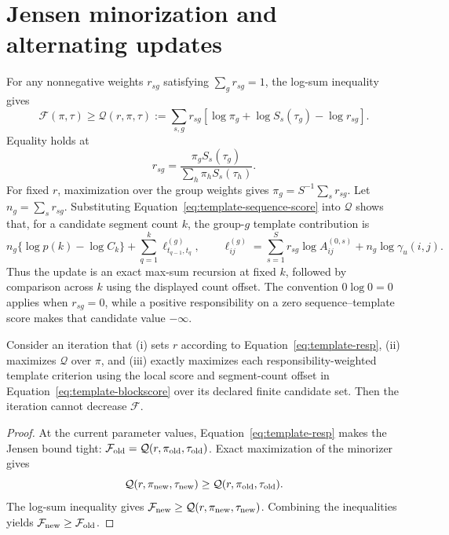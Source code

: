 \section{Jensen minorization and alternating updates}
\label{sec:latent-em}
For any nonnegative weights $r_{sg}$ satisfying $\sum_g r_{sg}=1$, the log-sum inequality gives
\begin{equation}
\mathcal F(\pi,\tau)\ge
\mathcal Q(r,\pi,\tau):=
\sum_{s,g}r_{sg}\left[\log\pi_g+\log S_s(\tau_g)-\log r_{sg}\right].
\label{eq:template-bound}
\end{equation}
Equality holds at
\begin{equation}
 r_{sg}=\frac{\pi_gS_s(\tau_g)}{\sum_h\pi_hS_s(\tau_h)}.
\label{eq:template-resp}
\end{equation}
For fixed $r$, maximization over the group weights gives
$\pi_g=S^{-1}\sum_s r_{sg}$. Let $n_g=\sum_s r_{sg}$. Substituting
Equation~\eqref{eq:template-sequence-score} into $\mathcal Q$ shows that, for a candidate segment
count $k$, the group-$g$ template contribution is
\begin{equation}
 n_g\{\log p(k)-\log C_k\}
 +\sum_{q=1}^{k}\ell^{(g)}_{t_{q-1},t_q},
\qquad
 \ell^{(g)}_{ij}=\sum_{s=1}^{S}r_{sg}\log A^{(0,s)}_{ij}
                  +n_g\log\gamma_u(i,j).
\label{eq:template-blockscore}
\end{equation}
Thus the update is an exact max-sum recursion at fixed $k$, followed by comparison across $k$ using
the displayed count offset. The convention $0\log0=0$ applies when $r_{sg}=0$, while a positive
responsibility on a zero sequence--template score makes that candidate value $-\infty$.

\begin{theorem}
\label{thm:em-monotone}
Consider an iteration that (i) sets $r$ according to Equation~\eqref{eq:template-resp}, (ii)
maximizes $\mathcal Q$ over $\pi$, and (iii) exactly maximizes each responsibility-weighted template
criterion using the local score and segment-count offset in Equation~\eqref{eq:template-blockscore}
over its declared finite candidate set. Then the iteration cannot decrease $\mathcal F$.
\end{theorem}
\begin{proof}
At the current parameter values, Equation~\eqref{eq:template-resp} makes the Jensen bound tight:
$\mathcal F_{\rm old}=\mathcal Q(r,\pi_{\rm old},\tau_{\rm old})$. Exact maximization of the
minorizer gives
\[
\mathcal Q(r,\pi_{\rm new},\tau_{\rm new})\ge
\mathcal Q(r,\pi_{\rm old},\tau_{\rm old}).
\]
The log-sum inequality gives
$\mathcal F_{\rm new}\ge\mathcal Q(r,\pi_{\rm new},\tau_{\rm new})$.
Combining the inequalities yields $\mathcal F_{\rm new}\ge\mathcal F_{\rm old}$.
\end{proof}

